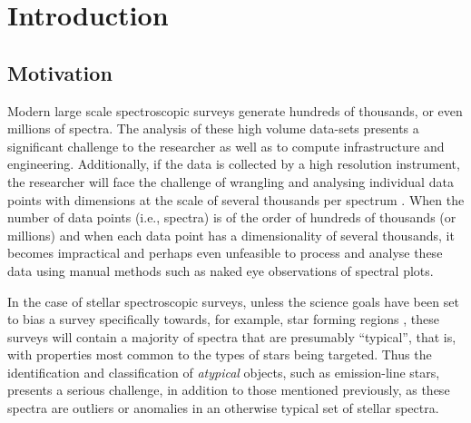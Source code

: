\chapter{Introduction}
\section{Motivation}
Modern large scale spectroscopic surveys generate hundreds of thousands, or even millions of spectra. The analysis of these high volume data-sets presents a significant challenge to the researcher as well as to compute infrastructure and engineering. Additionally, if the data is collected by a high resolution instrument, the researcher will face the challenge of wrangling and analysing individual data points with dimensions at the scale of several thousands per spectrum \citep[e.g.,][]{buder2021galah+}. When the number of data points (i.e., spectra) is of the order of hundreds of thousands (or millions) and when each data point has a dimensionality of several thousands, it becomes impractical and perhaps even unfeasible to process and analyse these data using manual methods such as naked eye observations of spectral plots. 

In the case of stellar spectroscopic surveys, unless the science goals have been set to bias a survey specifically towards, for example, star forming regions  \citep{traven2015gaia}, these surveys will contain a majority of spectra that are presumably ``typical'', that is, with properties most common to the types of stars being targeted. Thus the identification and classification of {\em atypical} objects, such as emission-line stars, presents a serious challenge, in addition to those mentioned previously, as these spectra are outliers or anomalies in an otherwise typical set of stellar spectra.


